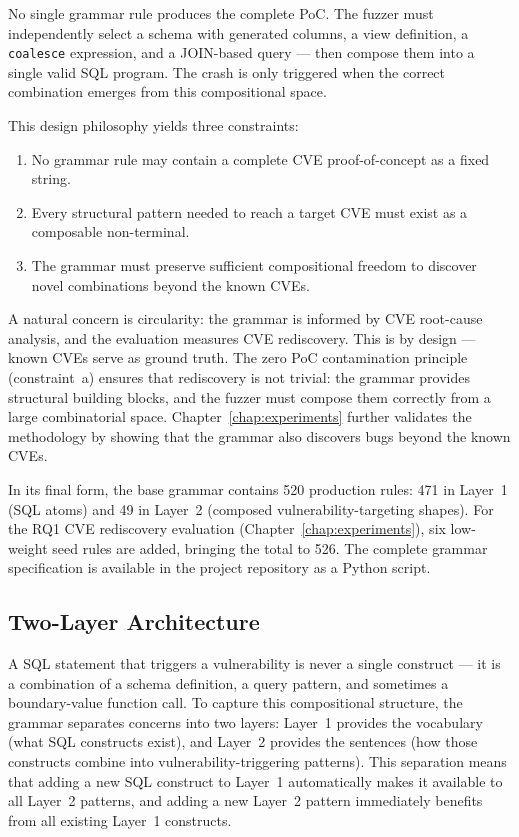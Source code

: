 No single grammar rule produces the complete PoC. The fuzzer must independently select a schema with generated columns, a view definition, a \texttt{coalesce} expression, and a JOIN-based query --- then compose them into a single valid SQL program. The crash is only triggered when the correct combination emerges from this compositional space.

This design philosophy yields three constraints:

\begin{enumerate}[label=(\alph*)]
    \item No grammar rule may contain a complete CVE proof-of-concept as a fixed string.
    \item Every structural pattern needed to reach a target CVE must exist as a composable non-terminal.
    \item The grammar must preserve sufficient compositional freedom to discover novel combinations beyond the known CVEs.
\end{enumerate}

A natural concern is circularity: the grammar is informed by CVE root-cause analysis, and the evaluation measures CVE rediscovery. This is by design --- known CVEs serve as ground truth. The zero PoC contamination principle (constraint~a) ensures that rediscovery is not trivial: the grammar provides structural building blocks, and the fuzzer must compose them correctly from a large combinatorial space. Chapter~\ref{chap:experiments} further validates the methodology by showing that the grammar also discovers bugs beyond the known CVEs.

In its final form, the base grammar contains 520 production rules: 471 in Layer~1 (SQL atoms) and 49 in Layer~2 (composed vulnerability-targeting shapes). For the RQ1 CVE rediscovery evaluation (Chapter~\ref{chap:experiments}), six low-weight seed rules are added, bringing the total to 526. The complete grammar specification is available in the project repository as a Python script.

\subsection{Two-Layer Architecture}
\label{sec:layer-decomposition}

A SQL statement that triggers a vulnerability is never a single construct --- it is a combination of a schema definition, a query pattern, and sometimes a boundary-value function call. To capture this compositional structure, the grammar separates concerns into two layers: Layer~1 provides the vocabulary (what SQL constructs exist), and Layer~2 provides the sentences (how those constructs combine into vulnerability-triggering patterns). This separation means that adding a new SQL construct to Layer~1 automatically makes it available to all Layer~2 patterns, and adding a new Layer~2 pattern immediately benefits from all existing Layer~1 constructs.

